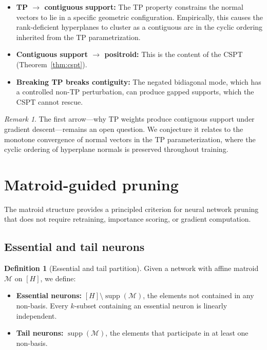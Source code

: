 \documentclass[11pt]{article}
\theoremstyle{definition}
\newtheorem{definition}[theorem]{Definition}
\theoremstyle{remark}
\newtheorem{remark}[theorem]{Remark}
\newcommand{\cM}{\mathcal{M}}
\DeclareMathOperator{\supp}{supp}
\begin{document}
\begin{itemize}
  \item \textbf{TP $\to$ contiguous support:} The TP property
    constrains the normal vectors to lie in a specific geometric
    configuration.  Empirically, this causes the rank-deficient
    hyperplanes to cluster as a contiguous arc in the cyclic ordering
    inherited from the TP parametrization.

  \item \textbf{Contiguous support $\to$ positroid:} This is the
    content of the CSPT (Theorem~\ref{thm:cspt}).

  \item \textbf{Breaking TP breaks contiguity:} The negated
    bidiagonal mode, which has a controlled non-TP perturbation,
    can produce gapped supports, which the CSPT cannot rescue.
\end{itemize}

\begin{remark}
  The first arrow---why TP weights produce contiguous support under
  gradient descent---remains an open question.  We conjecture it
  relates to the monotone convergence of normal vectors in the TP
  parameterization, where the cyclic ordering of hyperplane normals
  is preserved throughout training.
\end{remark}


\section{Matroid-guided pruning}\label{sec:pruning}

The matroid structure provides a principled criterion for neural
network pruning that does not require retraining, importance scoring,
or gradient computation.

\subsection{Essential and tail neurons}\label{sec:essential-tail}

\begin{definition}[Essential and tail partition]
  Given a network with affine matroid $\cM$ on $[H]$, we define:
  \begin{itemize}
    \item \textbf{Essential neurons:} $[H] \setminus \supp(\cM)$,
      the elements not contained in any non-basis.  Every $k$-subset
      containing an essential neuron is linearly independent.
    \item \textbf{Tail neurons:} $\supp(\cM)$, the elements that
      participate in at least one non-basis.
  \end{itemize}
\end{definition}
\end{document}
